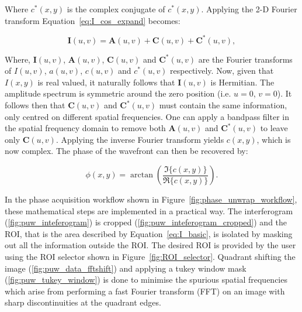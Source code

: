 Where $c^{*}(x,y)$ is the complex conjugate of $c^{*}(x,y)$. Applying the 2-D Fourier transform Equation~\ref{eq:I_cos_expand} becomes:

\begin{equation}\label{eq:I_fourier}
\boldsymbol{I}(u,v) = \boldsymbol{A}(u,v) + \boldsymbol{C}(u,v) + \boldsymbol{C}^{*}(u,v),
\end{equation}

Where, $\boldsymbol{I}(u,v)$, $\boldsymbol{A}(u,v)$, $\boldsymbol{C}(u,v)$ and  $\boldsymbol{C}^{*}(u,v)$ are the Fourier transforms of $I(u,v)$, $a(u,v)$, $c(u,v)$ and $c^{*}(u,v)$ respectively. Now, given that $I(x,y)$ is real valued, it naturally follows that $\boldsymbol{I}(u,v)$ is Hermitian. The amplitude spectrum is symmetric around the zero position (i.e. $u = 0$, $v = 0$). It follows then that $\boldsymbol{C}(u,v)$ and $\boldsymbol{C}^{*}(u,v)$ must contain the same information, only centred on different spatial frequencies. One can apply a bandpass filter in the spatial frequency domain to remove both $\boldsymbol{A}(u,v)$ and $\boldsymbol{C}^{*}(u,v)$ to leave only $\boldsymbol{C}(u,v)$\cite{lewis1993absolute}. Applying the inverse Fourier transform yields $c(x,y)$, which is now complex. The phase of the wavefront can then be recovered by:

\begin{equation}\label{eq:phase}
\phi(x,y) = \arctan\left(\frac{\Im\{c(x,y)\}}{\Re\{c(x,y)\}}\right).
\end{equation}

In the phase acquisition workflow shown in Figure~\ref{fig:phase_unwrap_workflow}, these mathematical steps are implemented in a practical way. The interferogram (\ref{fig:puw_inteferogram}) is cropped (\ref{fig:puw_inteferogram_cropped}) and the ROI, that is the area described by Equation~\ref{eq:I_basic}, is isolated by masking out all the information outside the ROI. The desired ROI is provided by the user using the ROI selector shown in Figure~\ref{fig:ROI_selector}. Quadrant shifting the image (\ref{fig:puw_data_fftshift}) and applying a tukey window mask (\ref{fig:puw_tukey_window}) is done to minimise the spurious spatial frequencies which arise from performing a fast Fourier transform (FFT) on an image with sharp discontinuities at the quadrant edges.

